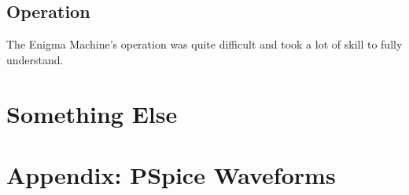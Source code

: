 \documentclass[12pt,a4paper,titlepage]{article}
\begin{document}
\subsection{Operation}
The Enigma Machine's operation was quite difficult and took a lot of skill to
fully understand. 

\section{Something Else}

\newpage

\appendix

\section{Appendix: PSpice Waveforms}

\newpage
\printbibliography
\end{document}
